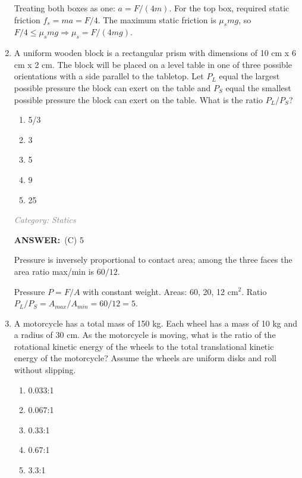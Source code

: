 ﻿\documentclass[12pt, a4paper]{article}
\makeatletter
\newcommand{\finalanswer}[1]{\textbf{ANSWER:}~#1}
\newif\if@categoryprinted
\newcommand{\category}[1]{\if@categoryprinted\relax\else\textit{\textcolor{gray}{Category: #1}}\global\@categoryprintedtrue\fi}
\newcommand{\tags}[1]{}
\makeatother
\begin{document}
\begin{CJK*}{UTF8}{gbsn}
\begin{enumerate}[itemsep=1.0em, topsep=0.6em]
\begin{solutionbox}
Treating both boxes as one: $a=F/(4m)$. For the top box, required static friction $f_s=m a=F/4$. The maximum static friction is $\mu_s mg$, so $F/4\le \mu_s mg \Rightarrow \mu_s=F/(4mg)$.
\end{solutionbox}

\newpage

\item \label{prob:37}
A uniform wooden block is a rectangular prism with dimensions of 10 cm x 6 cm x 2 cm. The block will be placed on a level table in one of three possible orientations with a side parallel to the tabletop. Let $P_L$ equal the largest possible pressure the block can exert on the table and $P_S$ equal the smallest possible pressure the block can exert on the table. What is the ratio $P_L/P_S$? 
\begin{enumerate}[label=(\Alph*)]
    \item 5/3
    \item 3
    \item 5
    \item 9
    \item 25
\end{enumerate}

\category{Statics} \tags{}
\begin{answerbox}
\finalanswer{(C) 5}
\end{answerbox}
\begin{insightbox}
Pressure is inversely proportional to contact area; among the three faces the area ratio max/min is $60/12$.
\end{insightbox}
\begin{solutionbox}

Pressure $P=F/A$ with constant weight. Areas: 60, 20, 12 cm$^2$. Ratio $P_L/P_S=A_{max}/A_{min}=60/12=5$.
\end{solutionbox}

\item \label{prob:38}
A motorcycle has a total mass of 150 kg. Each wheel has a mass of 10 kg and a radius of 30 cm. As the motorcycle is moving, what is the ratio of the rotational kinetic energy of the wheels to the total translational kinetic energy of the motorcycle? Assume the wheels are uniform disks and roll without slipping.
\begin{enumerate}[label=(\Alph*)]
    \item 0.033:1
    \item 0.067:1
    \item 0.33:1
    \item 0.67:1
    \item 3.3:1
\end{enumerate}


\end{enumerate}
\end{CJK*}
\end{document}

